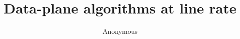 \documentclass{hotnets15}
\begin{document}
 {}
\date{}


\title{Data-plane algorithms at line rate}

\author{Anonymous}

\maketitle


~\cite{vanjacobson}









 
\begin{small}

\end{small}
\label{last-page}
\end{document}
